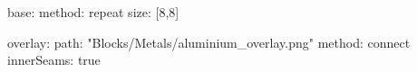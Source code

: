 base:
  method: repeat
  size: [8,8]
  
overlay:
  path: "Blocks/Metals/aluminium_overlay.png"
  method: connect
  innerSeams: true